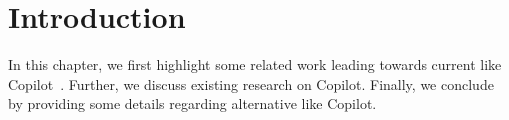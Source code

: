 \label{chapter:background}

\newlength{\savedunitlength}
\setlength{\unitlength}{2em}

\section{Introduction}
In this chapter, we first highlight some related work leading towards current \cct{} like Copilot~\cite{Copilot-web}. Further, we discuss existing research on Copilot. Finally, we conclude by providing some details regarding alternative \cct{} like Copilot.






\setlength{\unitlength}{\savedunitlength}
